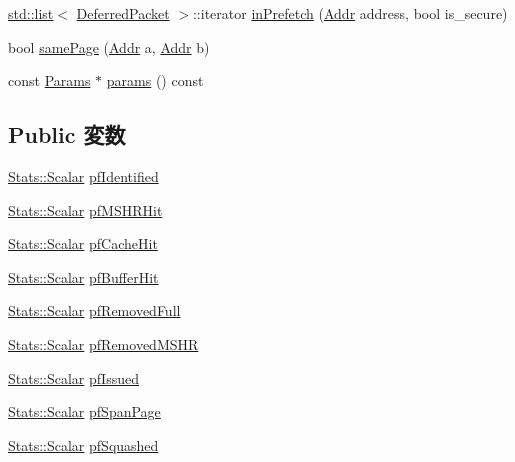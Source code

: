 \begin{DoxyCompactItemize}
\item 
\hyperlink{classstd_1_1list}{std::list}$<$ \hyperlink{classBasePrefetcher_1_1DeferredPacket}{DeferredPacket} $>$::iterator \hyperlink{classBasePrefetcher_a50ff64f84defcdcd4e1ecc3f7df52af1}{inPrefetch} (\hyperlink{base_2types_8hh_af1bb03d6a4ee096394a6749f0a169232}{Addr} address, bool is\_\-secure)
\item 
bool \hyperlink{classBasePrefetcher_a0092f15516ff429fb7437fd21747fbf5}{samePage} (\hyperlink{base_2types_8hh_af1bb03d6a4ee096394a6749f0a169232}{Addr} a, \hyperlink{base_2types_8hh_af1bb03d6a4ee096394a6749f0a169232}{Addr} b)
\item 
const \hyperlink{classBasePrefetcher_a46661f02a5642b04fd4e12f645ad9c5c}{Params} $\ast$ \hyperlink{classBasePrefetcher_acd3c3feb78ae7a8f88fe0f110a718dff}{params} () const 
\end{DoxyCompactItemize}
\subsection*{Public 変数}
\begin{DoxyCompactItemize}
\item 
\hyperlink{classStats_1_1Scalar}{Stats::Scalar} \hyperlink{classBasePrefetcher_aa83003235229fe6e7aae462188f4d63d}{pfIdentified}
\item 
\hyperlink{classStats_1_1Scalar}{Stats::Scalar} \hyperlink{classBasePrefetcher_a16b12f81a92a01a460e62a7785e0726d}{pfMSHRHit}
\item 
\hyperlink{classStats_1_1Scalar}{Stats::Scalar} \hyperlink{classBasePrefetcher_a61e01d10fc3d03b88341a0663ede2177}{pfCacheHit}
\item 
\hyperlink{classStats_1_1Scalar}{Stats::Scalar} \hyperlink{classBasePrefetcher_a2df98c96edba641dbec623185d5c801b}{pfBufferHit}
\item 
\hyperlink{classStats_1_1Scalar}{Stats::Scalar} \hyperlink{classBasePrefetcher_a33b63796ece1306bb25b4abcbb8e888e}{pfRemovedFull}
\item 
\hyperlink{classStats_1_1Scalar}{Stats::Scalar} \hyperlink{classBasePrefetcher_ac2aa69cf510d48d234493085b96d810b}{pfRemovedMSHR}
\item 
\hyperlink{classStats_1_1Scalar}{Stats::Scalar} \hyperlink{classBasePrefetcher_a616b66672824772fbc0ac255630074a8}{pfIssued}
\item 
\hyperlink{classStats_1_1Scalar}{Stats::Scalar} \hyperlink{classBasePrefetcher_a2e71998cfd3608b558c489b33280d0e6}{pfSpanPage}
\item 
\hyperlink{classStats_1_1Scalar}{Stats::Scalar} \hyperlink{classBasePrefetcher_ae39544ad55ce96aa1560f3f3fc8f5906}{pfSquashed}
\end{DoxyCompactItemize}
